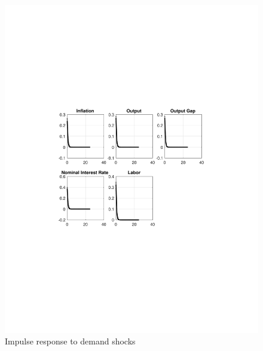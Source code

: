 \documentclass[12pt]{article}
\theoremstyle{definition}
\begin{document}
\begin{figure}[H]
	\centering
	\includegraphics[width=\linewidth, height = 0.4\textheight]{impulse_demand}
	\caption{Impulse response to demand shocks}
	\label{fig:impulse_demand}
\end{figure}
\end{document}
